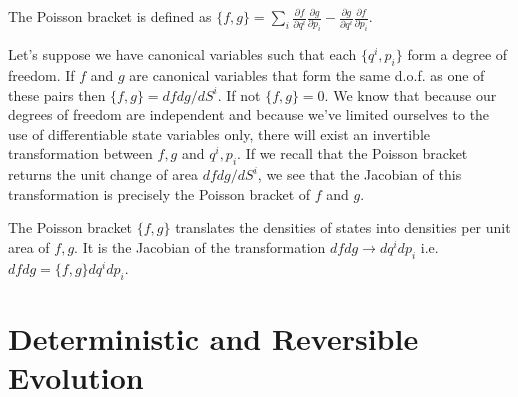 \documentclass{article}[a4paper]
\begin{document}
\begin{defn}
	The Poisson bracket is defined as $\{f,g\} = \sum_i \frac{\partial f}{\partial q^i}\frac{\partial g}{\partial p_i} - \frac{\partial g}{\partial q^i}\frac{\partial f}{\partial p_i}$.
\end{defn}

	Let's suppose we have canonical variables such that each $\{q^i,p_i\}$ form a degree of freedom. If $f$ and $g$ are canonical variables that form the same d.o.f. as one of these pairs then $\{f,g \} = dfdg/dS^i$. If not $\{f,g \} = 0$. We know that because our degrees of freedom are independent and because we've limited ourselves to the use of differentiable state variables only, there will exist an invertible transformation between $f,g$ and $q^i,p_i$. If we recall that the Poisson bracket returns the unit change of area $dfdg/dS^i$, we see that the Jacobian of this transformation is precisely the Poisson bracket of $f$ and $g$.

\begin{prop}
	The Poisson bracket $\{f, g\}$ translates the densities of states into densities per unit area of $f, g$. It is the Jacobian of the transformation $dfdg \rightarrow dq^idp_i$ i.e. $dfdg = \{f,g\}dq^idp_i$.
\end{prop}
	
\section{Deterministic and Reversible Evolution}

\end{document}
